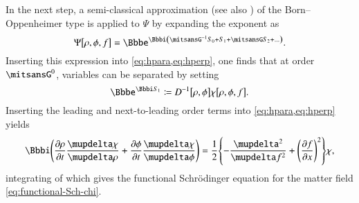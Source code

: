 In the next step, a semi-classical approximation (see also \cite[sec.\ 
5.4]{Kiefer2012}) of the Born--Oppenheimer type is applied to $\Psi$ by 
expanding the exponent as
\begin{equation}
\sfun{\Psi}{\rho,\phi,f} = \ee^{\ii\rbr{\nG^{-1}S_0 + S_1 + \nG S_2 + \ldots}}.
\end{equation}
Inserting this expression into \cref{eq:hpara,eq:hperp}, one finds that at 
order $\nG^{0}$, variables can be separated by setting
\begin{equation}
\ee^{\ii S_1} \coloneqq \sfun{D^{-1}}{\rho,\phi}\sfun{\chi}{\rho,\phi,f}.
\end{equation}
Inserting the leading and next-to-leading order terms into 
\cref{eq:hpara,eq:hperp} yields
\begin{equation}
\ii \rbr{\frpa{\rho}{t}\frdva{\chi}{\rho} + \frpa{\phi}{t}\frdva{\chi}{\phi}} = 
\frac{1}{2}\cbr{-\frdva{^2}{f^2}+\rbr{\frpa{f}{x}}^2} \chi,
\end{equation}
integrating of which gives the functional Schrödinger equation for the matter 
field \eqref{eq:functional-Sch-chi}.




